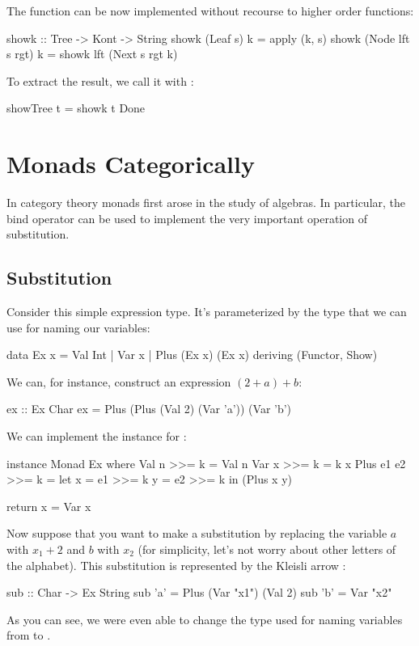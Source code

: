 \documentclass[DaoFP]{subfiles}
\begin{document}
The  function can be now implemented without recourse to higher order functions:
\begin{haskell}
showk :: Tree -> Kont -> String
showk (Leaf s) k = apply (k, s)
showk (Node lft s rgt) k = showk lft (Next s rgt k)
\end{haskell}
To extract the result, we call it with :
\begin{haskell}
showTree t = showk t Done
\end{haskell}

\section{Monads Categorically}

In category theory monads first arose in the study of algebras. In particular, the bind operator can be used to implement the very important operation of substitution. 

\subsection{Substitution}

Consider this simple expression type. It's parameterized by the type  that we can use for naming our variables:
\begin{haskell}
data Ex x = Val Int 
          | Var x 
          | Plus (Ex x) (Ex x) 
 deriving (Functor, Show)
\end{haskell}
We can, for instance, construct an expression $(2 + a) + b$:
\begin{haskell}
ex :: Ex Char
ex = Plus (Plus (Val 2) (Var 'a')) (Var 'b')
\end{haskell}
We can implement the  instance for :
\begin{haskell}
instance Monad Ex where
  Val n >>= k = Val n
  Var x >>= k = k x
  Plus e1 e2 >>= k = 
    let x = e1 >>= k
        y = e2 >>= k
    in (Plus x y)
    
  return x = Var x 
\end{haskell}

Now suppose that you want to make a substitution by replacing the variable $a$ with $x_1 + 2$ and $b$ with $x_2$ (for simplicity, let's not worry about other letters of the alphabet). This substitution is represented by the Kleisli arrow :
\begin{haskell}
sub :: Char -> Ex String
sub 'a' = Plus (Var "x1") (Val 2)
sub 'b' = Var "x2"
\end{haskell}
As you can see, we were even able to change the type used for naming variables from  to .
\end{document}
